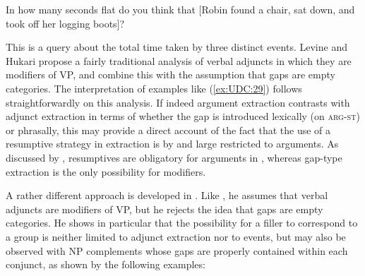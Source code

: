 \documentclass[output=paper
,notxmath 
	        ,collection
	        ,collectionchapter
 	        ,biblatex
                ,babelshorthands
                ,newtxmath
                ,draftmode
                ,colorlinks, citecolor=brown
]{langscibook}
\begin{document}
\begin{exe}
\ex \label{ex:UDC:29}
In how many seconds flat do you think that [Robin found a chair,
sat down, and took off her logging boots]?
\end{exe}

\noindent
This is a query about the total time taken by three distinct events.
Levine and Hukari propose a fairly traditional analysis of verbal
adjuncts in which they are modifiers of VP, and combine this with the
assumption that gaps are empty categories. The interpretation of
examples like (\ref{ex:UDC:29}) follows straightforwardly on this
analysis. If indeed argument extraction contrasts with adjunct
extraction in terms of whether the gap is introduced  lexically (on
\textsc{arg-st}) or phrasally, this may
provide a direct account of the fact that the use of a resumptive
strategy in extraction is by and large restricted to arguments. As
discussed by \citet{Crysmann:Reintges:14}, resumptives are obligatory
for arguments in , whereas gap-type extraction is the only
possibility for modifiers.
 

A rather different approach is developed in \citet{Chaves:09}. Like
\citet[Chapter~3]{Levine:Hukari:06}, he assumes that verbal adjuncts are
modifiers of VP, but he rejects the idea that gaps are empty
categories. He shows in particular that the possibility for a filler
to correspond to a group is neither limited to adjunct extraction nor
to events, but may also be observed with NP complements whose gaps are
properly contained within each conjunct, as shown by the following
examples:

\begin{exe} \ex \begin{xlist} \label{ex:UDC:31}


\end{xlist}
\end{exe}

\end{document}
